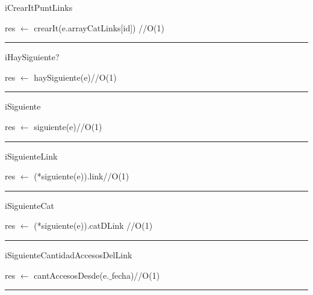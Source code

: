 \begin{algorithm}[H]
\caption{iCrearItPuntLinks}
\begin{algorithmic}[1]
\State res $\gets$ crearIt(e.arrayCatLinks[id]) \hfill //O(1)
\EndFunction 
\end{algorithmic}
\hrule
{}
\end{algorithm}

\begin{algorithm}[H]
\caption{iHaySiguiente?}
\begin{algorithmic}[1]
\state res $\gets$ haySiguiente(e)\hfill //O(1)
\EndFunction 
\end{algorithmic}
\hrule
{}
\end{algorithm}

\begin{algorithm}[H]
\caption{iSiguiente}
\begin{algorithmic}[1]
\state res $\gets$ siguiente(e)\hfill //O(1)
\EndFunction 
\end{algorithmic}
\hrule
{}
\end{algorithm}

\begin{algorithm}[H]
\caption{iSiguienteLink}
\begin{algorithmic}[1]
\state res $\gets$ (*siguiente(e)).link\hfill //O(1)
\EndFunction 
\end{algorithmic}
\hrule
{}
\end{algorithm}


\begin{algorithm}[H]
\caption{iSiguienteCat}
\begin{algorithmic}[1]
\state res $\gets$ (*siguiente(e)).catDLink \hfill //O(1)
\EndFunction 
\end{algorithmic}
\hrule
{}
\end{algorithm}

\begin{algorithm}[H]
\caption{iSiguienteCantidadAccesosDelLink}
\begin{algorithmic}[1]
\state res $\gets$ cantAccesosDesde(e.$\_$fecha)\hfill //O(1)
\EndFunction 
\end{algorithmic}
\hrule
{}
\end{algorithm}

